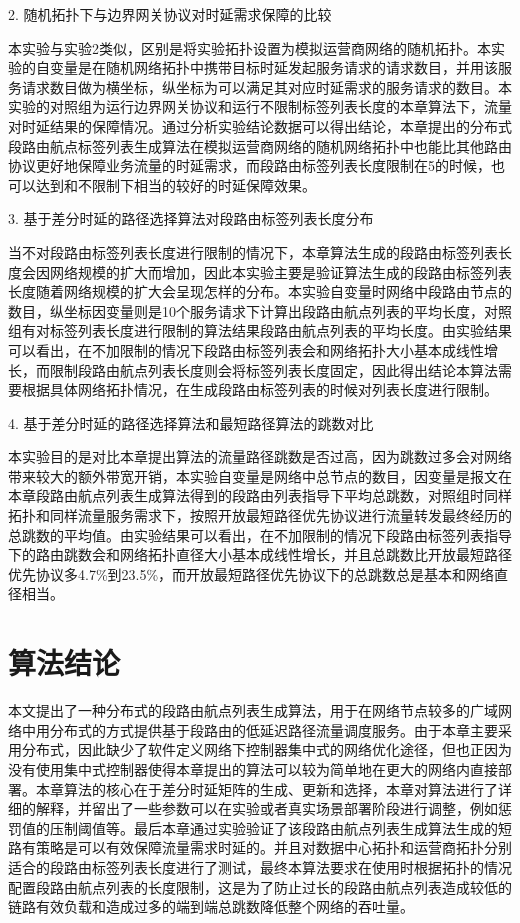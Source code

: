 2. 随机拓扑下与边界网关协议对时延需求保障的比较

本实验与实验2类似，区别是将实验拓扑设置为模拟运营商网络的随机拓扑。本实验的自变量是在随机网络拓扑中携带目标时延发起服务请求的请求数目，并用该服务请求数目做为横坐标，纵坐标为可以满足其对应时延需求的服务请求的数目。本实验的对照组为运行边界网关协议和运行不限制标签列表长度的本章算法下，流量对时延结果的保障情况。通过分析实验结论数据可以得出结论，本章提出的分布式段路由航点标签列表生成算法在模拟运营商网络的随机网络拓扑中也能比其他路由协议更好地保障业务流量的时延需求，而段路由标签列表长度限制在5的时候，也可以达到和不限制下相当的较好的时延保障效果。

3. 基于差分时延的路径选择算法对段路由标签列表长度分布

当不对段路由标签列表长度进行限制的情况下，本章算法生成的段路由标签列表长度会因网络规模的扩大而增加，因此本实验主要是验证算法生成的段路由标签列表长度随着网络规模的扩大会呈现怎样的分布。本实验自变量时网络中段路由节点的数目，纵坐标因变量则是10个服务请求下计算出段路由航点列表的平均长度，对照组有对标签列表长度进行限制的算法结果段路由航点列表的平均长度。由实验结果可以看出，在不加限制的情况下段路由标签列表会和网络拓扑大小基本成线性增长，而限制段路由航点列表长度则会将标签列表长度固定，因此得出结论本算法需要根据具体网络拓扑情况，在生成段路由标签列表的时候对列表长度进行限制。

4. 基于差分时延的路径选择算法和最短路径算法的跳数对比

本实验目的是对比本章提出算法的流量路径跳数是否过高，因为跳数过多会对网络带来较大的额外带宽开销，本实验自变量是网络中总节点的数目，因变量是报文在本章段路由航点列表生成算法得到的段路由列表指导下平均总跳数，对照组时同样拓扑和同样流量服务需求下，按照开放最短路径优先协议进行流量转发最终经历的总跳数的平均值。由实验结果可以看出，在不加限制的情况下段路由标签列表指导下的路由跳数会和网络拓扑直径大小基本成线性增长，并且总跳数比开放最短路径优先协议多4.7\%到23.5\%，而开放最短路径优先协议下的总跳数总是基本和网络直径相当。

\section{算法结论}

本文提出了一种分布式的段路由航点列表生成算法，用于在网络节点较多的广域网络中用分布式的方式提供基于段路由的低延迟路径流量调度服务。由于本章主要采用分布式，因此缺少了软件定义网络下控制器集中式的网络优化途径，但也正因为没有使用集中式控制器使得本章提出的算法可以较为简单地在更大的网络内直接部署。本章算法的核心在于差分时延矩阵的生成、更新和选择，本章对算法进行了详细的解释，并留出了一些参数可以在实验或者真实场景部署阶段进行调整，例如惩罚值的压制阈值等。最后本章通过实验验证了该段路由航点列表生成算法生成的短路有策略是可以有效保障流量需求时延的。并且对数据中心拓扑和运营商拓扑分别适合的段路由标签列表长度进行了测试，最终本算法要求在使用时根据拓扑的情况配置段路由航点列表的长度限制，这是为了防止过长的段路由航点列表造成较低的链路有效负载和造成过多的端到端总跳数降低整个网络的吞吐量。

